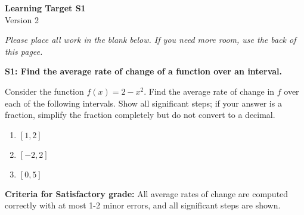 \documentclass[10pt]{article}
\begin{document}
	\vspace*{0in}

		\begin{center}
			\textbf{Learning Target S1} \\
			{Version 2} \\
		\end{center}

\emph{Please place all work in the blank below. If you need more room, use the back of this pagee.}

\begin{framed}
	\textbf{S1: Find the average rate of change of a function over an interval.}
\end{framed}

Consider the function $f(x) = 2 - x^2$. Find the average rate of change in $f$ over each of the following intervals. Show all significant steps; if your answer is a fraction, simplify the fraction completely but do not convert to a decimal. 

\begin{enumerate}
    \item $[1, 2]$
    \item $[-2,2]$
    \item $[0, 5]$
\end{enumerate}

\vfill


\begin{small}
    \begin{framed}
        	\textbf{Criteria for Satisfactory grade:} All average rates of change are computed correctly with at most 1-2 minor errors, and all significant steps are shown. 
    \end{framed}

\end{small}
\end{document}
